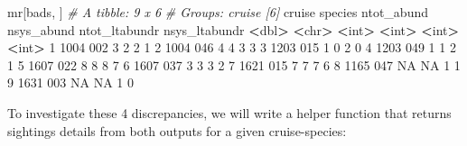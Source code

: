 \documentclass[
]{book}
\newenvironment{Shaded}{\begin{snugshade}}{\end{snugshade}}
\newcommand{\CommentTok}[1]{\textcolor[rgb]{0.56,0.35,0.01}{\textit{#1}}}
\newcommand{\DecValTok}[1]{\textcolor[rgb]{0.00,0.00,0.81}{#1}}
\newcommand{\ErrorTok}[1]{\textcolor[rgb]{0.64,0.00,0.00}{\textbf{#1}}}
\newcommand{\NormalTok}[1]{#1}
\newcommand{\OperatorTok}[1]{\textcolor[rgb]{0.81,0.36,0.00}{\textbf{#1}}}
\newcommand{\OtherTok}[1]{\textcolor[rgb]{0.56,0.35,0.01}{#1}}
\newcommand{\StringTok}[1]{\textcolor[rgb]{0.31,0.60,0.02}{#1}}
\begin{document}
\begin{Shaded}
\begin{Highlighting}[]
\NormalTok{mr[bads, ]}
\CommentTok{# A tibble: 9 x 6}
\CommentTok{# Groups:   cruise [6]}
\NormalTok{  cruise species ntot_abund nsys_abund ntot_ltabundr nsys_ltabundr}
   \OperatorTok{<}\NormalTok{dbl}\OperatorTok{>}\StringTok{ }\ErrorTok{<}\NormalTok{chr}\OperatorTok{>}\StringTok{        }\ErrorTok{<}\NormalTok{int}\OperatorTok{>}\StringTok{      }\ErrorTok{<}\NormalTok{int}\OperatorTok{>}\StringTok{         }\ErrorTok{<}\NormalTok{int}\OperatorTok{>}\StringTok{         }\ErrorTok{<}\NormalTok{int}\OperatorTok{>}
\DecValTok{1}   \DecValTok{1004} \DecValTok{002}              \DecValTok{3}          \DecValTok{2}             \DecValTok{2}             \DecValTok{1}
\DecValTok{2}   \DecValTok{1004} \DecValTok{046}              \DecValTok{4}          \DecValTok{4}             \DecValTok{3}             \DecValTok{3}
\DecValTok{3}   \DecValTok{1203} \DecValTok{015}              \DecValTok{1}          \DecValTok{0}             \DecValTok{2}             \DecValTok{0}
\DecValTok{4}   \DecValTok{1203} \DecValTok{049}              \DecValTok{1}          \DecValTok{1}             \DecValTok{2}             \DecValTok{1}
\DecValTok{5}   \DecValTok{1607} \DecValTok{022}              \DecValTok{8}          \DecValTok{8}             \DecValTok{8}             \DecValTok{7}
\DecValTok{6}   \DecValTok{1607} \DecValTok{037}              \DecValTok{3}          \DecValTok{3}             \DecValTok{3}             \DecValTok{2}
\DecValTok{7}   \DecValTok{1621} \DecValTok{015}              \DecValTok{7}          \DecValTok{7}             \DecValTok{7}             \DecValTok{6}
\DecValTok{8}   \DecValTok{1165} \DecValTok{047}             \OtherTok{NA}         \OtherTok{NA}             \DecValTok{1}             \DecValTok{1}
\DecValTok{9}   \DecValTok{1631} \DecValTok{003}             \OtherTok{NA}         \OtherTok{NA}             \DecValTok{1}             \DecValTok{0}
\end{Highlighting}
\end{Shaded}

To investigate these 4 discrepancies, we will write a helper function that returns sightings details from both outputs for a given cruise-species:
\end{document}
